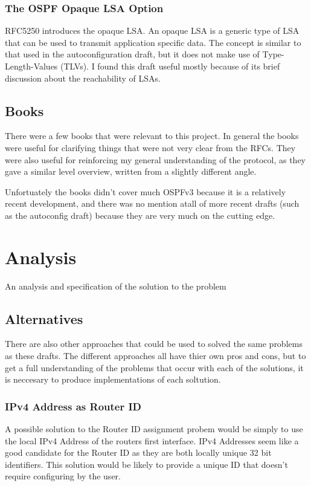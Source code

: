 \documentclass[12pt]{report}
\begin{document}
\subsection{The OSPF Opaque LSA Option}
RFC5250 introduces the opaque LSA. An opaque LSA is a generic type of LSA that can 
be used to transmit application specific data. The concept is similar to that used 
in the autoconfiguration draft, but it does not make use of Type-Length-Values 
(TLVs). I found this draft useful mostly because of its brief discussion about the  
reachability of LSAs.

\section{Books}
There were a few books that were relevant to this project. In general the books were 
useful for clarifying things that were not very clear from the RFCs. They were also 
useful for reinforcing my general understanding of the protocol, as they gave a 
similar level overview, written from a slightly different angle. 

Unfortuately the books didn't cover much OSPFv3 because it is a relatively recent 
development, and there was no mention atall of more recent drafts (such as the 
autoconfig draft) because they are very much on the cutting edge.

\chapter{Analysis}
An analysis and specification of the solution to the problem

\section{Alternatives}
There are also other approaches that could be used to solved the same problems as 
these drafts. The different approaches all have thier own pros and cons, but to get 
a full understanding of the problems that occur with each of the solutions, it is 
neccesary to produce implementations of each soltution.

\subsection{IPv4 Address as Router ID}
A possible solution to the Router ID assignment probem would be simply to use the 
local IPv4 Address of the routers first interface. IPv4 Addresses seem like a good 
candidate for the Router ID as they are both locally unique 32 bit identifiers. This 
solution would be likely to provide a unique ID that doesn't require configuring by 
the user.
 
\end{document}
